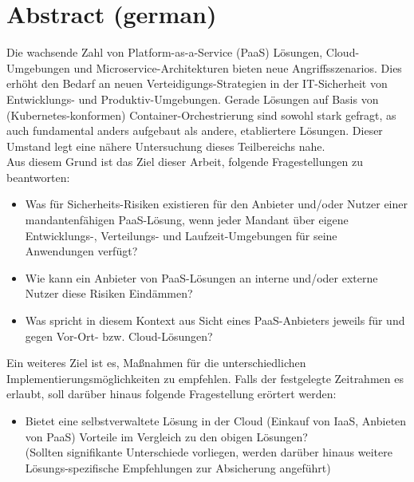 \chapter*{Abstract (german)}
\thispagestyle{empty}

Die wachsende Zahl von Platform-as-a-Service (PaaS) Lösungen, Cloud-Umgebungen und Microservice-Architekturen bieten neue Angriffsszenarios.
Dies erhöht den Bedarf an neuen Verteidigungs-Strategien in der IT-Sicherheit von Entwicklungs- und Produktiv-Umgebungen.
Gerade Lösungen auf Basis von (Kubernetes-konformen) Container-Orchestrierung sind sowohl stark gefragt, as auch fundamental anders aufgebaut als andere, etabliertere Lösungen.
Dieser Umstand legt eine nähere Untersuchung dieses Teilbereichs nahe. \\
Aus diesem Grund ist das Ziel dieser Arbeit, folgende Fragestellungen zu beantworten:

\begin{itemize}

\item Was für Sicherheits-Risiken existieren für den Anbieter und/oder Nutzer einer mandantenfähigen PaaS-Lösung, wenn jeder Mandant über eigene Entwicklungs-, Verteilungs- und Laufzeit-Umgebungen für seine Anwendungen verfügt?


\item Wie kann ein Anbieter von PaaS-Lösungen an interne und/oder externe Nutzer diese Risiken Eindämmen?

\item Was spricht in diesem Kontext aus Sicht eines PaaS-Anbieters jeweils für und gegen Vor-Ort- bzw. Cloud-Lösungen?

\end{itemize}

Ein weiteres Ziel ist es, Maßnahmen für die unterschiedlichen Implementierungsmöglichkeiten zu empfehlen.
Falls der festgelegte Zeitrahmen es erlaubt, soll darüber hinaus folgende Fragestellung erörtert werden:

\begin{itemize}

\item Bietet eine selbstverwaltete Lösung in der Cloud (Einkauf von IaaS, Anbieten von PaaS) Vorteile im Vergleich zu den obigen Lösungen?\\
(Sollten signifikante Unterschiede vorliegen, werden darüber hinaus weitere Lösungs-spezifische Empfehlungen zur Absicherung angeführt)

\end{itemize}


